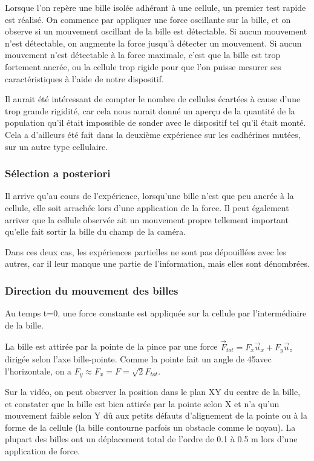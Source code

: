 Lorsque l'on repère une bille isolée adhérant à une cellule, un premier test rapide est réalisé.
On commence par appliquer une force oscillante sur la bille, et on observe si un mouvement oscillant de la bille est détectable. Si aucun mouvement n'est détectable, on augmente la force jusqu'à détecter un mouvement. Si aucun mouvement n'est détectable à la force maximale, c'est que la bille est trop fortement ancrée, ou la cellule trop rigide pour que l'on puisse mesurer ses caractéristiques à l'aide de notre dispositif. 

Il aurait été intéressant de compter le nombre de cellules écartées à cause d'une trop grande rigidité, car cela nous aurait donné un aperçu de la quantité de la population qu'il était impossible de sonder avec le dispositif tel qu'il était monté. Cela a d'ailleurs été fait dans la deuxième expérience sur les cadhérines mutées, sur un autre type cellulaire. 

\subsubsection{Sélection a posteriori}

Il arrive qu'au cours de l'expérience, lorsqu'une bille n'est que peu ancrée à la cellule, elle soit arrachée lors d'une application de la force.
Il peut également arriver que la cellule observée ait un mouvement propre tellement important qu'elle fait sortir la bille du  champ de la caméra. 

Dans ces deux cas, les expériences partielles ne sont pas dépouillées avec les autres, car il leur manque une partie de l'information, mais elles sont dénombrées.



\subsubsection{Direction du mouvement des billes}
Au temps t=0, une force constante est appliquée sur la cellule par l'intermédiaire de la bille. 

La bille est attirée par la pointe de la pince par une force $\vec{F}_{tot}=F_x \vec{u}_x+F_y \vec{u}_z$ dirigée selon l'axe bille-pointe. Comme la pointe fait un angle de 45\degres  avec l'horizontale, on a $F_y \approx F_x = F = \sqrt{2} F_{tot}$. 

Sur la vidéo, on peut observer la position dans le plan XY du centre de la bille, et constater que la bille est bien attirée par la pointe selon X et n'a qu'un mouvement faible selon Y dû aux petits défauts d'alignement de la pointe ou à la forme de la cellule (la bille contourne parfois un obstacle comme le noyau). La plupart des billes ont un déplacement total de l'ordre de 0.1 à 0.5 \micro m lors d'une application de force. 

